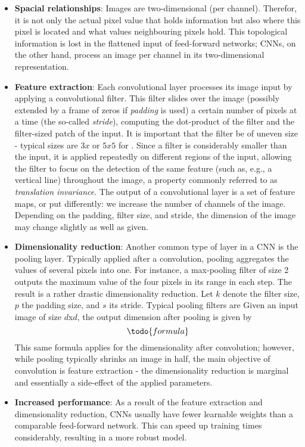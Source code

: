 \documentclass[british,12p]{article}
\begin{document}
    \begin{itemize}
    	\item \textbf{Spacial relationships}: Images are two-dimensional	(per channel). Therefor, it is not only the actual pixel value that holds information but also where this pixel is located and what values neighbouring pixels hold. This topological information is lost in the flattened input of feed-forward networks; CNNs, on the other hand, process an image per channel in its two-dimensional representation. 
    	\item \textbf{Feature extraction}: Each convolutional layer processes its image input by applying a convolutional filter. This filter slides over the image (possibly extended by a frame of zeros if \textit{padding} is used) a certain number of pixels at a time (the so-called \textit{stride}), computing the dot-product of the filter and the filter-sized patch of the input. It is important that the filter be of uneven size - typical sizes are $3x$ or $5x5$ for . Since a filter is considerably smaller than the input, it is applied repeatedly on different regions of the input, allowing the filter to focus on the detection of the same feature (such as, e.g., a vertical line) throughout the image, a property commonly referred to as \textit{translation invariance}. The output of a convolutional layer is a set of feature maps, or put differently: we increase the number of channels of the image. Depending on the padding, filter size, and stride, the dimension of the image may change slightly as well as given.
    	\item \textbf{Dimensionality reduction}: Another common type of layer in a CNN is the pooling layer. Typically applied after a convolution, pooling aggregates the values of several pixels into one. For instance, a max-pooling filter of size 2 outputs the maximum value of the four pixels in its range in each step. The result is a rather drastic dimensionality reduction. Let $k$ denote the filter size, $p$ the padding size, and $s$ its stride. Typical pooling filters are Given an input image of size $d$x$d$, the output dimension after pooling is given by
    	$$\todo{formula}$$
    	This same formula applies for the dimensionality after convolution; however, while pooling typically shrinks an image in half, the main objective of convolution is feature extraction - the dimensionality reduction is marginal and essentially a side-effect of the applied parameters. 
    	\item \textbf{Increased performance}: As a result of the feature extraction and dimensionality reduction, CNNs usually have fewer learnable weights than a comparable feed-forward network. This can speed up training times considerably, resulting in a more robust model.
    \end{itemize}
    
\end{document}
